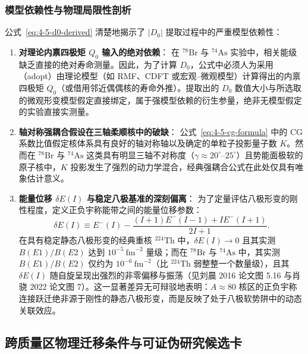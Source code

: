\subsubsection{模型依赖性与物理局限性剖析}

公式~\eqref{eq:4-5-d0-derived} 清楚地揭示了 $|D_0|$ 提取过程中的严重模型依赖性：
\begin{enumerate}
\item \textbf{对理论内禀四极矩 $Q_0$ 输入的绝对依赖}：
在 $^{78}\mathrm{Br}$ 与 $^{74}\mathrm{As}$ 实验中，相关能级缺乏直接的绝对寿命测量。因此，为了计算 $D_0$，公式中必须人为采用（adopt）由理论模型（如 RMF、CDFT 或宏观--微观模型）计算得出的内禀四极矩 $Q_0$（或借用邻近偶偶核的寿命外推）。提取出的 $D_0$ 数值大小与所选取的微观形变模型假定直接绑定，属于强模型依赖的衍生参量，绝非无模型假定的实验直接实测量。
\item \textbf{轴对称强耦合假设在三轴柔顺核中的破缺}：
公式~\eqref{eq:4-5-cg-formula} 中的 CG 系数比值假定核体系具有良好的轴对称轴以及确定的单粒子投影量子数 $K$。然而在 $^{78}\mathrm{Br}$ 与 $^{74}\mathrm{As}$ 这类具有明显三轴不对称度（$\gamma \approx 20^\circ$--$25^\circ$）且势能面极软的原子核中，$K$ 投影发生了强烈的动力学混合，经典强耦合公式在此处仅具有唯象估计意义。
\item \textbf{能量位移 $\delta E(I)$ 与稳定八极基准的深刻偏离}：
为了定量评估八极形变的刚性程度，定义正负宇称能带之间的能量位移参数：
\begin{equation}\label{eq:4-5-delta-e-def}
\delta E(I) \equiv E^-(I) - \frac{(I+1) E^-(I-1) + I E^-(I+1)}{2I + 1}.
\end{equation}
在具有稳定静态八极形变的经典重核 $^{224}\mathrm{Th}$ 中，$\delta E(I) \to 0$ 且其实测 $B(E1)/B(E2)$ 达到 $10^{-5}\ \mathrm{fm}^{-2}$ 量级；而在 $^{78}\mathrm{Br}$ 与 $^{74}\mathrm{As}$ 中，其实测 $B(E1)/B(E2)$ 仅约为 $10^{-6}\ \mathrm{fm}^{-2}$（比 $^{224}\mathrm{Th}$ 弱整整一个数量级），且其 $\delta E(I)$ 随自旋呈现出强烈的非零偏移与振荡（见刘晨 2016 论文图 5.16 与肖骁 2022 论文图 7）。这一显著差异无可辩驳地表明：$A\approx 80$ 核区的正负宇称连接跃迁绝非源于刚性的静态八极形变，而是反映了处于八极软势阱中的动态关联效应。
\end{enumerate}

\subsection{跨质量区物理迁移条件与可证伪研究候选卡}\label{sec:4-5-6}

